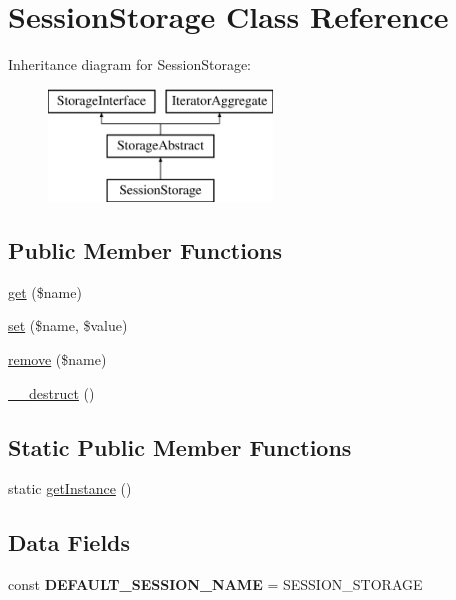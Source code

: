 \hypertarget{class_pes_1_1_storage_1_1_session_storage}{}\section{Session\+Storage Class Reference}
\label{class_pes_1_1_storage_1_1_session_storage}
Inheritance diagram for Session\+Storage\+:\begin{figure}[H]
\begin{center}
\leavevmode
\includegraphics[height=3.000000cm]{class_pes_1_1_storage_1_1_session_storage}
\end{center}
\end{figure}
\subsection*{Public Member Functions}
\begin{DoxyCompactItemize}
\item 
\mbox{\hyperlink{class_pes_1_1_storage_1_1_session_storage_af5ea6a083ddb07beb8a30dd32e309ceb}{get}} (\$name)
\item 
\mbox{\hyperlink{class_pes_1_1_storage_1_1_session_storage_aa4c6a0b87c6e47fa6f863eedb300e707}{set}} (\$name, \$value)
\item 
\mbox{\hyperlink{class_pes_1_1_storage_1_1_session_storage_aebff052f548656a86f5b9e0048a5c325}{remove}} (\$name)
\item 
\mbox{\hyperlink{class_pes_1_1_storage_1_1_session_storage_a421831a265621325e1fdd19aace0c758}{\+\_\+\+\_\+destruct}} ()
\end{DoxyCompactItemize}
\subsection*{Static Public Member Functions}
\begin{DoxyCompactItemize}
\item 
static \mbox{\hyperlink{class_pes_1_1_storage_1_1_session_storage_ac93fbec81f07e5d15f80db907e63dc10}{get\+Instance}} ()
\end{DoxyCompactItemize}
\subsection*{Data Fields}
\begin{DoxyCompactItemize}
\item 
\mbox{\label{class_pes_1_1_storage_1_1_session_storage_a75b25196fbbf8f1fe25aa2f131e1418b}} 
const {\bfseries D\+E\+F\+A\+U\+L\+T\+\_\+\+S\+E\+S\+S\+I\+O\+N\+\_\+\+N\+A\+ME} = \textquotesingle{}S\+E\+S\+S\+I\+O\+N\+\_\+\+S\+T\+O\+R\+A\+GE\textquotesingle{}
\end{DoxyCompactItemize}
